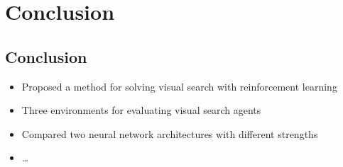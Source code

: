 \section{Conclusion}

\subsection{Conclusion}

\begin{frame}
    \begin{itemize}
        \item Proposed a method for solving visual search with reinforcement learning
        \item Three environments for evaluating visual search agents
        \item Compared two neural network architectures with different strengths
        \item \dots
    \end{itemize}
\end{frame}
